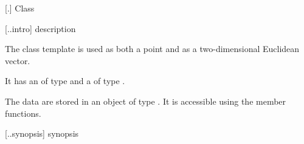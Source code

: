  [\iotwod.\pointtwod] {Class }

 [\iotwod.\pointtwod.intro] { description}

%
\pnum
The class template  is used as both a point and as a two-dimensional Euclidean vector.

\pnum
It has an  of type  and a  of type .

\pnum
The data are stored in an object of type . It is accessible using the  member functions.

 [\iotwod.\pointtwod.synopsis] { synopsis}

